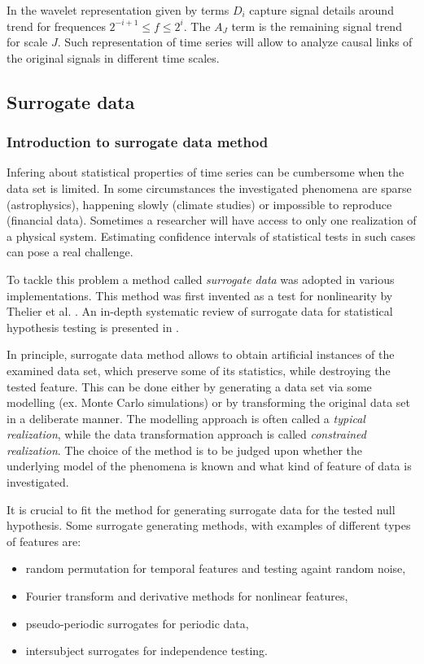 In the wavelet representation given by  terms $D_i$ capture signal details around trend for frequences $2^{-i+1} \leq f \leq 2^{i}$.
The $A_J$ term is the remaining signal trend for scale $J$.
Such representation of time series will allow to analyze causal links of the original signals in different time scales.

\subsection{Surrogate data}

\subsubsection{Introduction to surrogate data method}
Infering about statistical properties of time series can be cumbersome when the data set is limited.
In some circumstances the investigated phenomena are sparse (astrophysics), happening slowly (climate studies) or impossible to reproduce (financial data).
Sometimes a researcher will have access to only one realization of a physical system.
Estimating confidence intervals of statistical tests in such cases can pose a real challenge.

To tackle this problem a method called \emph{surrogate data} was adopted in various implementations.
This method was first invented as a test for nonlinearity by Thelier et al. \cite{1992-thelier}.
An in-depth systematic review of surrogate data for statistical hypothesis testing is presented in \cite{2018-lancaster}.

In principle, surrogate data method allows to obtain artificial instances of the examined data set, which preserve some of its statistics, while destroying the tested feature.
This can be done either by generating a data set via some modelling (ex. Monte Carlo simulations) or by transforming the original data set in a deliberate manner.
The modelling approach is often called a \emph{typical realization}, while the data transformation approach is called \emph{constrained realization}.
The choice of the method is to be judged upon whether the underlying model of the phenomena is known and what kind of feature of data is investigated. 

It is crucial to fit the method for generating surrogate data for the tested null hypothesis.
Some surrogate generating methods, with examples of different types of features are:
\begin{itemize}
    \item random permutation for temporal features and testing againt random noise,
    \item Fourier transform and derivative methods for nonlinear features,
    \item pseudo-periodic surrogates for periodic data,
    \item intersubject surrogates for independence testing.
\end{itemize}

